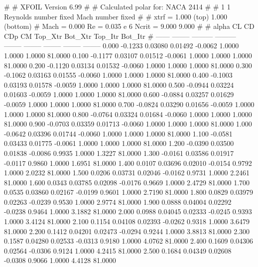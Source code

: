 #  
#       XFOIL         Version 6.99
#  
# Calculated polar for: NACA 2414                                       
#  
# 1 1 Reynolds number fixed          Mach number fixed         
#  
# xtrf =   1.000 (top)        1.000 (bottom)  
# Mach =   0.000     Re =     0.035 e 6     Ncrit =   9.000  9.000
#  
#   alpha    CL        CD       CDp       CM     Top_Xtr  Bot_Xtr  Top_Itr  Bot_Itr
#  ------ -------- --------- --------- -------- -------- -------- -------- --------
   0.000  -0.1233   0.03080   0.01492  -0.0062   1.0000   1.0000   1.0000  81.0000
   0.100  -0.1177   0.03107   0.01512  -0.0061   1.0000   1.0000   1.0000  81.0000
   0.200  -0.1120   0.03134   0.01532  -0.0060   1.0000   1.0000   1.0000  81.0000
   0.300  -0.1062   0.03163   0.01555  -0.0060   1.0000   1.0000   1.0000  81.0000
   0.400  -0.1003   0.03193   0.01578  -0.0059   1.0000   1.0000   1.0000  81.0000
   0.500  -0.0944   0.03224   0.01603  -0.0059   1.0000   1.0000   1.0000  81.0000
   0.600  -0.0884   0.03257   0.01629  -0.0059   1.0000   1.0000   1.0000  81.0000
   0.700  -0.0824   0.03290   0.01656  -0.0059   1.0000   1.0000   1.0000  81.0000
   0.800  -0.0764   0.03324   0.01684  -0.0060   1.0000   1.0000   1.0000  81.0000
   0.900  -0.0703   0.03359   0.01713  -0.0060   1.0000   1.0000   1.0000  81.0000
   1.000  -0.0642   0.03396   0.01744  -0.0060   1.0000   1.0000   1.0000  81.0000
   1.100  -0.0581   0.03433   0.01775  -0.0061   1.0000   1.0000   1.0000  81.0000
   1.200  -0.0390   0.03500   0.01838  -0.0086   0.9935   1.0000   1.3227  81.0000
   1.300  -0.0161   0.03586   0.01917  -0.0117   0.9860   1.0000   1.6951  81.0000
   1.400   0.0107   0.03696   0.02010  -0.0154   0.9792   1.0000   2.0232  81.0000
   1.500   0.0206   0.03731   0.02046  -0.0162   0.9731   1.0000   2.2461  81.0000
   1.600   0.0343   0.03785   0.02098  -0.0176   0.9669   1.0000   2.4729  81.0000
   1.700   0.0535   0.03860   0.02167  -0.0199   0.9601   1.0000   2.7190  81.0000
   1.800   0.0829   0.03979   0.02263  -0.0239   0.9530   1.0000   2.9774  81.0000
   1.900   0.0888   0.04004   0.02292  -0.0238   0.9464   1.0000   3.1882  81.0000
   2.000   0.0988   0.04045   0.02333  -0.0245   0.9393   1.0000   3.4124  81.0000
   2.100   0.1154   0.04108   0.02393  -0.0262   0.9318   1.0000   3.6479  81.0000
   2.200   0.1412   0.04201   0.02473  -0.0294   0.9244   1.0000   3.8813  81.0000
   2.300   0.1587   0.04280   0.02533  -0.0313   0.9180   1.0000   4.0762  81.0000
   2.400   0.1609   0.04306   0.02564  -0.0306   0.9124   1.0000   4.2415  81.0000
   2.500   0.1684   0.04349   0.02608  -0.0308   0.9066   1.0000   4.4128  81.0000
